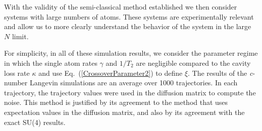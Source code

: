 \documentclass[aps,
twocolumn,
showpacs,
superscriptaddress,groupedaddress]{revtex4}
\begin{document}
With the validity of the semi-classical method established we then
consider systems with large numbers of atoms.  These systems are
experimentally relevant and allow us to more clearly understand the
behavior of the system in the large $N$ limit.

For simplicity, in all of these simulation results, we consider the
parameter regime in which the single atom rates $\gamma$ and $1/T_2$
are negligible compared to the cavity loss rate $\kappa$ and use
Eq.~(\ref{CrossoverParameter2}) to define $\xi$.  The results of the {\it c}-number Langevin simulations are an average over 1000 trajectories. In each trajectory, the trajectory values were used in the diffusion matrix to compute the noise. This method is justified by its agreement to the method that uses expectation values in the diffusion matrix, and also by its agreement with the exact SU(4) results.
\end{document}
